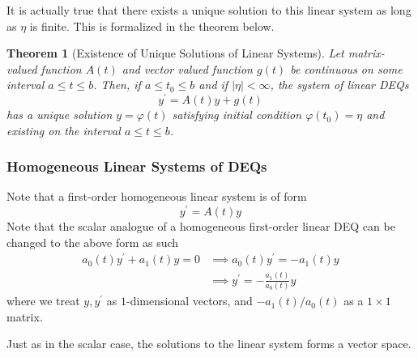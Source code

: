 \documentclass{article}
\newtheorem{theorem}{Theorem}[section]
\theoremstyle{remark}
\theoremstyle{definition}
\begin{document}
    It is actually true that there exists a unique solution to this linear system as long as $\eta$ is finite. This is formalized in the theorem below. 

    \begin{theorem}[Existence of Unique Solutions of Linear Systems]
    Let matrix-valued function $A(t)$ and vector valued function $g(t)$ be continuous on some interval $a \leq t \leq b$. Then, if $a\leq t_0 \leq b$ and if $|\eta| < \infty$, the system of linear DEQs
    \[y^\prime = A(t) y + g(t)\]
    has a unique solution $y = \varphi(t)$ satisfying initial condition $\varphi(t_0) = \eta$ and existing on the interval $a \leq t \leq b$. 
    \end{theorem}

    \subsubsection{Homogeneous Linear Systems of DEQs}

      Note that a first-order homogeneous linear system is of form 
      \[y^\prime = A(t) y\]
      Note that the scalar analogue of a homogeneous first-order linear DEQ can be changed to the above form as such 
      \begin{align*}
          a_0 (t) y^\prime + a_1 (t) y = 0 & \implies a_0 (t) y^\prime = - a_1 (t) y \\
          & \implies y^\prime = -\frac{a_1 (t)}{a_0 (t)} y
      \end{align*}
      where we treat $y, y^\prime$ as $1$-dimensional vectors, and $-a_1(t)/a_0 (t)$ as a $1 \times 1$ matrix. 

      Just as in the scalar case, the solutions to the linear system forms a vector space. 
\end{document}
